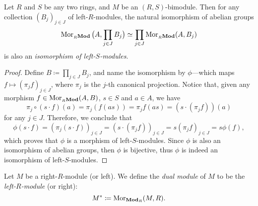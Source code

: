 \begin{theorem}
\label{thm:iso-prod-bimodules-morphism-set}
Let \(R\) and \(S\) be any two rings, and \(M\) be an \((R, S)\)-bimodule. Then
for any collection \((B_j)_{j \in J}\) of left-\(R\)-modules, the natural
isomorphism of abelian groups
\[
\operatorname{Mor}_{{{}_{R}\textbf{Mod}}}\big(A, \prod_{j \in J} B_j\big)
\simeq
\prod_{j \in J} \operatorname{Mor}_{{{}_{R}\textbf{Mod}}}(A, B_j)
\]
is also an \emph{isomorphism of left-\(S\)-modules}.
\end{theorem}

\begin{proof}
Define \(B \coloneq \prod_{j \in J} B_j\), and name the isomorphism by
\(\phi\)---which maps \(f \mapsto (\pi_j f)_{j \in J}\), where \(\pi_j\) is the
\(j\)-th canonical projection. Notice that, given any morphism \(f \in
\operatorname{Mor}_{{{}_{R}\textbf{Mod}}}(A, B)\), \(s \in S\) and \(a \in A\), we have
\[
\pi_j \circ (s \cdot f)(a) = \pi_j(f(a s))
= \pi_j f(a s) = (s \cdot (\pi_j f))(a)
\]
for any \(j \in J\). Therefore, we conclude that
\[
\phi(s \cdot f) = (\pi_j(s \cdot f))_{j \in J} = (s \cdot (\pi_j f))_{j \in J}
= s (\pi_j f)_{j \in J} = s \phi(f),
\]
which proves that \(\phi\) is a morphism of left-\(S\)-modules. Since \(\phi\)
is also an isomorphism of abelian groups, then \(\phi\) is bijective, thus
\(\phi\) is indeed an isomorphism of left-\(S\)-modules.
\end{proof}

\begin{definition}
\label{def:dual-module}
Let \(M\) be a right-\(R\)-module (or left). We define
the \emph{dual module} of \(M\) to be the \emph{left-\(R\)-module}
(or right):
\[
M^{*} \coloneq \operatorname{Mor}_{{\textbf{Mod}_{R}}}(M, R).
\]
\end{definition}




